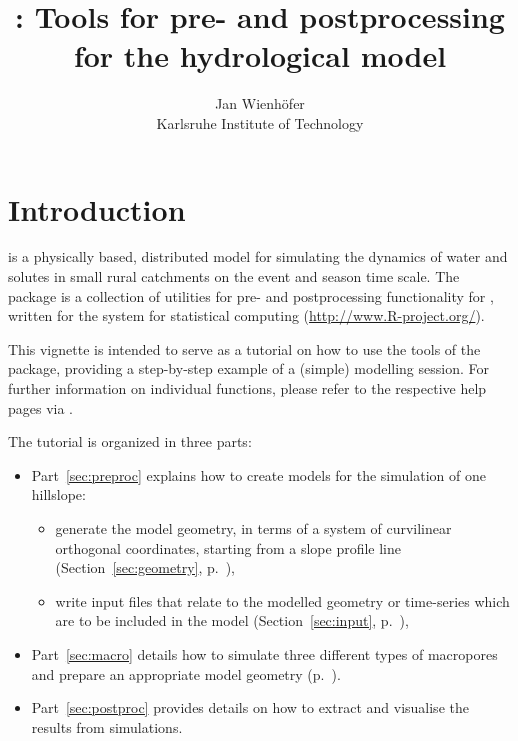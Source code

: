 \documentclass[article,nojss]{jss}\usepackage[]{graphicx}\usepackage[]{xcolor}
\author{Jan Wienhöfer\\Karlsruhe Institute of Technology}
\title{\pkg{Catflow}: Tools for pre- and postprocessing for the hydrological model \proglang{CATFLOW}}
\begin{document}
\tableofcontents




                                            

\newpage
\section*{Introduction} 

  is a physically based, distributed model for simulating the dynamics of water and solutes in small rural catchments on the event and season time scale. 
The  package is a collection of utilities for pre- and postprocessing functionality
for , 
written for the  system for statistical computing
(\url{http://www.R-project.org/}).

This vignette is intended to serve as a tutorial on how to use the tools of the
 package, providing a step-by-step example of a (simple) modelling session. 
For further information on individual functions, please refer to the respective help pages via .

The tutorial is organized in three parts:
\begin{itemize}
\item Part~\ref{sec:preproc} explains how to create  models for the simulation of one hillslope:
      \begin{itemize}
      \item generate the model geometry, in terms of a system of curvilinear orthogonal coordinates, 
            starting from a slope profile line (Section~\ref{sec:geometry}, p.~\pageref{sec:geometry}),
      \item write input files that relate to the modelled geometry or time-series 
            which are to be included in the model (Section~\ref{sec:input}, p.~\pageref{sec:input}),
       \end{itemize}
 \item Part~\ref{sec:macro} details how to simulate three different types of macropores and prepare an appropriate model geometry (p.~\pageref{sec:macro}).
 \item Part~\ref{sec:postproc} provides details on how to extract and visualise the results
 from  simulations.
 
\end{itemize}
 
\end{document}
